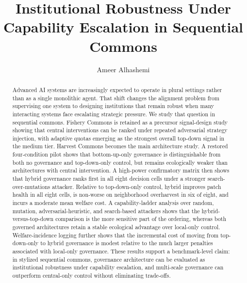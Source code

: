 \documentclass[10pt]{article}
\title{Institutional Robustness Under Capability Escalation in Sequential Commons}
\author{Ameer Alhashemi}
\date{}
\begin{document}
\maketitle

\begin{abstract}
Advanced AI systems are increasingly expected to operate in plural settings rather than as a single monolithic agent. That shift changes the alignment problem from supervising one system to designing institutions that remain robust when many interacting systems face escalating strategic pressure. We study that question in sequential commons. Fishery Commons is retained as a precursor signal-design study showing that central interventions can be ranked under repeated adversarial strategy injection, with adaptive quotas emerging as the strongest overall top-down signal in the medium tier. Harvest Commons becomes the main architecture study. A restored four-condition pilot shows that bottom-up-only governance is distinguishable from both no governance and top-down-only control, but remains ecologically weaker than architectures with central intervention. A high-power confirmatory matrix then shows that hybrid governance ranks first in all eight decision cells under a stronger search-over-mutations attacker. Relative to top-down-only control, hybrid improves patch health in all eight cells, is non-worse on neighborhood overharvest in six of eight, and incurs a moderate mean welfare cost. A capability-ladder analysis over random, mutation, adversarial-heuristic, and search-based attackers shows that the hybrid-versus-top-down comparison is the more sensitive part of the ordering, whereas both governed architectures retain a stable ecological advantage over local-only control. Welfare-incidence logging further shows that the incremental cost of moving from top-down-only to hybrid governance is modest relative to the much larger penalties associated with local-only governance. These results support a benchmark-level claim: in stylized sequential commons, governance architecture can be evaluated as institutional robustness under capability escalation, and multi-scale governance can outperform central-only control without eliminating trade-offs.
\end{abstract}






{\small


}
\end{document}
